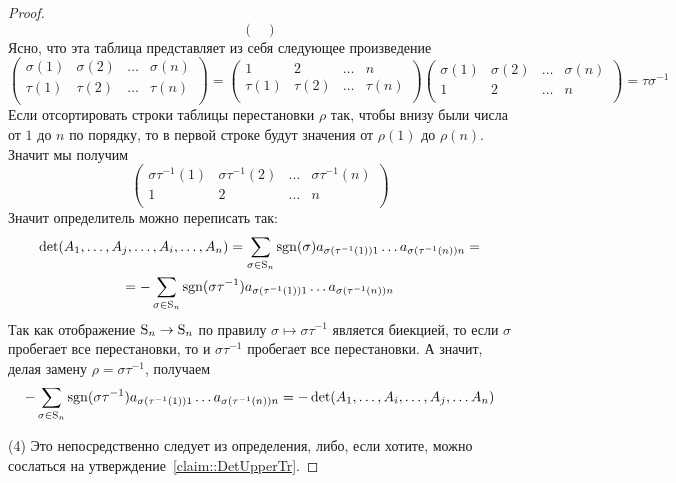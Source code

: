 \begin{proof}
\[\begin{pmatrix}
\end{pmatrix}
\]
Ясно, что эта таблица представляет из себя следующее произведение
\[
\begin{pmatrix}
{\sigma(1)}&{\sigma(2)}&{\ldots}&{\sigma(n)}\\
{\tau(1)}&{\tau(2)}&{\ldots}&{\tau(n)}\\
\end{pmatrix}
=
\begin{pmatrix}
{1}&{2}&{\ldots}&{n}\\
{\tau(1)}&{\tau(2)}&{\ldots}&{\tau(n)}\\
\end{pmatrix}
\begin{pmatrix}
{\sigma(1)}&{\sigma(2)}&{\ldots}&{\sigma(n)}\\
{1}&{2}&{\ldots}&{n}\\
\end{pmatrix}
=\tau \sigma^{-1}
\]
Если отсортировать строки таблицы перестановки $\rho$ так, чтобы внизу были числа от $1$ до $n$ по порядку, то в первой строке будут значения от $\rho(1)$ до $\rho(n)$.
Значит мы получим
\[
\begin{pmatrix}
{\sigma\tau^{-1}(1)}&{\sigma\tau^{-1}(2)}&{\ldots}&{\sigma \tau^{-1}(n)}\\
{1}&{2}&{\ldots}&{n}\\
\end{pmatrix}
\]
Значит определитель можно переписать так:
\begin{gather*}
\det (A_1,\ldots, A_j, \ldots, A_i, \ldots, A_n) = \sum_{\sigma\in\operatorname{S}_{n}}\operatorname{sgn}(\sigma) a_{\sigma(\tau^{-1}(1))1} \ldots a_{\sigma(\tau^{-1}(n))n} = \\
= - \sum_{\sigma\in\operatorname{S}_{n}}\operatorname{sgn}(\sigma\tau^{-1}) a_{\sigma(\tau^{-1}(1))1} \ldots a_{\sigma(\tau^{-1}(n))n}
\end{gather*}
Так как отображение $\operatorname{S}_{n}\to \operatorname{S}_{n}$ по правилу $\sigma\mapsto \sigma \tau^{-1}$ является биекцией, то если $\sigma$ пробегает все перестановки, то и $\sigma\tau^{-1}$ пробегает все перестановки.
А значит, делая замену $\rho = \sigma \tau^{-1}$, получаем
\[
-\sum_{\sigma\in\operatorname{S}_{n}} \operatorname{sgn}(\sigma\tau^{-1}) a_{\sigma(\tau^{-1}(1))1} \ldots a_{\sigma(\tau^{-1}(n))n} = -\det (A_1,\ldots, A_i, \ldots, A_j,\ldots A_n)
\]

(4) Это непосредственно следует из определения, либо, если хотите, можно сослаться на утверждение~\ref{claim::DetUpperTr}.
\end{proof}

